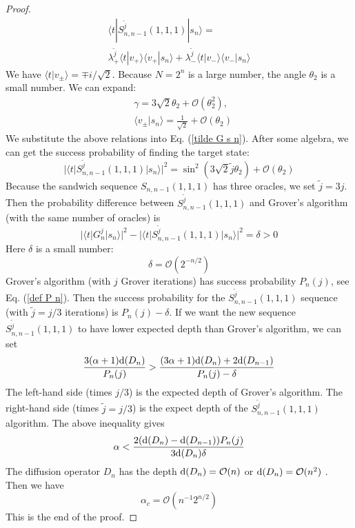 \documentclass[%
 twocolumn,
 10pt,
 superscriptaddress,
 longbibliography,
 amsmath,amssymb,
 aps,
 pra,
floatfix,
]{revtex4-1}
\begin{document}
\begin{proof}
\begin{multline}
    \label{tilde G s n}
     \langle t|S^{\tilde j}_{n,n-1}(1,1,1)|s_n\rangle= \\ \lambda_+^{\tilde j}\langle t|v_+\rangle\langle v_+|s_n\rangle+\lambda_-^{\tilde j}\langle t|v_-\rangle\langle v_-|s_n\rangle
\end{multline}
We have $\langle t|v_\pm\rangle = \mp i /\sqrt 2$. Because $N=2^n$ is a large number, the angle $\theta_2$ is a small number. We can expand:
\begin{subequations}
\begin{align}
    &\gamma= 3\sqrt 2 \theta_2+\mathcal O\left(\theta^2_2\right),\\
    &\langle v_\pm|s_n\rangle = \frac 1 {\sqrt 2} +\mathcal O\left(\theta_2\right)
\end{align}
\end{subequations}
We substitute the above relations into Eq. (\ref{tilde G s n}). After some algebra, we can get the success probability of finding the target state:
\begin{equation}
    |\langle t|S^{\tilde j}_{n,n-1}(1,1,1)|s_n\rangle|^2 = \sin^2\left(3\sqrt 2\tilde j\theta_2\right)+\mathcal O(\theta_2)
\end{equation}
Because the sandwich sequence $S_{n,n-1}(1,1,1)$ has three oracles, we set $\tilde j=3j$. Then the probability difference between $S^{\tilde j}_{n,n-1}(1,1,1)$ and Grover's algorithm (with the same number of oracles) is
\begin{equation}
|\langle t|G^j_n|s_n\rangle|^2 -|\langle t|S^{\tilde j}_{n,n-1}(1,1,1)|s_n\rangle|^2=\delta>0
\end{equation}
Here $\delta$ is a small number:
\begin{equation}
    \delta = \mathcal O(2^{-n/2})
\end{equation}
Grover's algorithm (with $j$ Grover iterations) has success probability $P_n(j)$, see Eq. (\ref{def P n}).
Then the success probability for the $S^{\tilde j}_{n,n-1}(1,1,1)$ sequence (with $\tilde j=j/3$ iterations) is $P_n(j)-\delta$. If we want the new sequence $S^{\tilde j}_{n,n-1}(1,1,1)$ to have lower expected depth than Grover's algorithm, we can set
\begin{equation}
    \frac{3(\alpha+1)\text d(D_n)}{P_n(j)}>\frac{(3\alpha+1)\text d(D_n)+2\text d(D_{n-1})}{P_n(j)-\delta}
\end{equation}    
The left-hand side (times $j/3$) is the expected depth of Grover's algorithm. The right-hand side (times $\tilde j=j/3$) is the expect depth of the $S^{\tilde j}_{n,n-1}(1,1,1)$ algorithm. The above inequality gives
\begin{equation}
\alpha < \frac{2(\text d(D_n)-\text d(D_{n-1}))P_n(j)}{3\text d(D_n)\delta}
\end{equation}
The diffusion operator $D_n$ has the depth $\text d(D_n) = \mathcal O(n)$ or $\text d(D_n) = \mathcal O(n^2)$ \cite{BBCDMSSSW95}. Then we have
\begin{equation}
    \alpha_c = \mathcal O(n^{-1}2^{n/2})
\end{equation}
This is the end of the proof.
\end{proof}
\end{document}
